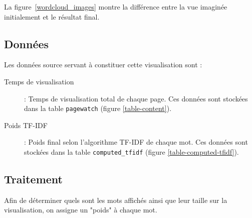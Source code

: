 		La figure~\ref{wordcloud_images} montre la différence entre la vue imaginée initialement et le résultat final.

	\subsection{Données}

		Les données source servant à constituer cette visualisation sont :
		\begin{description}
			\item[Temps de visualisation] : Temps de visualisation total de chaque page. Ces données sont stockées dans la table \texttt{pagewatch} (figure \ref{table-content}).
			\item[Poids TF-IDF] : Poids final selon l'algorithme TF-IDF de chaque mot. Ces données sont stockées dans la table \texttt{computed\_tfidf} (figure \ref{table-computed-tfidf}).
		\end{description}

	\subsection{Traitement}

		Afin de déterminer quels sont les mots affichés ainsi que leur taille sur la visualisation, on assigne un "poids" à chaque mot.

